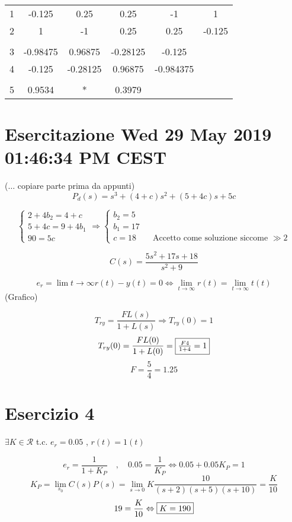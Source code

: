 \documentclass{article}
\begin{document}
\begin{tabular}{c|c c c c c}
    1 & -0.125 & 0.25 & 0.25 & -1 & 1\\
    2 & 1 & -1 & 0.25 & 0.25 & -0.125\\
    \\
    3 & -0.98475 & 0.96875 & -0.28125 & -0.125\\
    4 & -0.125 & -0.28125 & 0.96875 & -0.984375\\
    \\
    5 & 0.9534 & * & 0.3979
\end{tabular}
\newpage
\section{Esercitazione Wed 29 May 2019 01:46:34 PM CEST}

($\ldots$ copiare parte prima da appunti)
\[ P_d (s) = s^3 + (4+c) s^2 + (5+4c)s + 5c \]

\[
\begin{cases}
2 + 4b_2 = 4+c\\
5 + 4c = 9+4b_1\\
90 = 5c
\end{cases}
\Rightarrow
\begin{cases}
b_2 = 5\\
b_1=17\\
c=18 \qquad \text{Accetto come soluzione siccome $\gg 2$}
\end{cases}
\]

\[
    C(s) = \frac{5s^2 + 17s + 18}{s^2 + 9}
\]

\[ e_r = \lim{t \to \infty} r(t)-y(t) = 0 \Leftrightarrow \lim _{t\to \infty} r(t) = \lim_{t\to\infty} t(t) \]
(Grafico)

\[ T_{ry} = \frac{FL(s)}{1 + L(s)} \Rightarrow T_{ry}(0) = 1\]
\[ T_{ry}(0) = \frac{FL(0)}{1+L(0)} = \framebox{$\frac{F4}{1+4} = 1$} \]
\[ F= \frac{5}{4} = 1.25 \]


\section{Esercizio 4}

$\exists K \in \mathcal{R} $ t.c. $e_r = 0.05$ , $r(t) = 1(t)$

\[ e_r = \frac{1}{1+K_P} \quad , \quad 0.05=\frac{1}{K_P} \Leftrightarrow 0.05 + 0.05 K_P = 1\]
\[K_P = \lim_{s_0} C(s)P(s) = \lim_{s\to 0} K \frac{10}{(s+2)(s+5)(s+10)} = \frac{K}{10}\]
\[ 19 = \frac{K}{10} \Leftrightarrow \framebox{$K = 190$} \]
\end{document}
